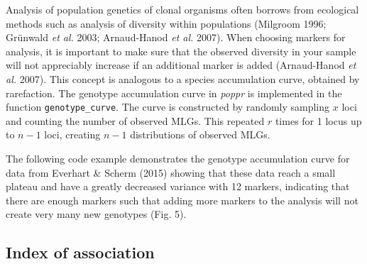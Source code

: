 \documentclass[double,12pt]{beavtex}
\begin{document}
  Analysis of population genetics of clonal organisms often borrows from
  ecological methods such as analysis of diversity within populations
  (Milgroom 1996; Grünwald \emph{et al.} 2003; Arnaud-Hanod \emph{et al.}
  2007). When choosing markers for analysis, it is important to make sure
  that the observed diversity in your sample will not appreciably increase
  if an additional marker is added (Arnaud-Hanod \emph{et al.} 2007). This
  concept is analogous to a species accumulation curve, obtained by
  rarefaction. The genotype accumulation curve in \emph{poppr} is
  implemented in the function \texttt{genotype\_curve}. The curve is
  constructed by randomly sampling \(x\) loci and counting the number of
  observed MLGs. This repeated \(r\) times for 1 locus up to \(n-1\) loci,
  creating \(n-1\) distributions of observed MLGs.
  
  The following code example demonstrates the genotype accumulation curve
  for data from Everhart \& Scherm (2015) showing that these data reach a
  small plateau and have a greatly decreased variance with 12 markers,
  indicating that there are enough markers such that adding more markers
  to the analysis will not create very many new genotypes (Fig. 5).
  
  \begin{Shaded}
  \begin{Highlighting}[]
  \NormalTok{(}\NormalTok{)}
  \NormalTok{(}\NormalTok{)}
  \NormalTok{(}\NormalTok{, } \NormalTok{)}
  
  \NormalTok{(}\NormalTok{)}
   \NormalTok{)}
  \StringTok{ }\NormalTok{() +}\StringTok{ }\NormalTok{()   }
  \StringTok{ }\NormalTok{(}\NormalTok{(} \NormalTok{)) }
  \end{Highlighting}
  \end{Shaded}
  
  \subsection{Index of association}\label{index-of-association-1}
  
\end{document}
